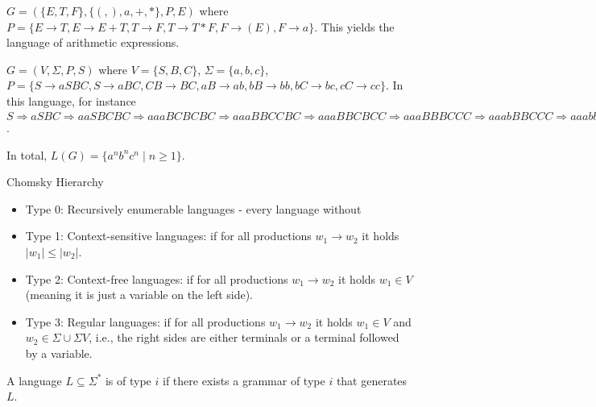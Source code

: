 \documentclass{beamer}
\begin{document}
\begin{frame}
    \begin{example}
        $G=(\{E,T,F\},\{(,),a,+,*\},P,E)$ where $P=\{E\to T, E\to E+T, T\to F, T\to T*F, F\to (E), F\to a\}$. This yields the language of arithmetic expressions.
    \end{example}
\end{frame}

\begin{frame}
    \begin{example}
        $G=(V,\Sigma,P,S)$ where $V=\{S,B,C\}$, $\Sigma=\{a,b,c\}$, $P=\{S\to aSBC, S\to aBC, CB\to BC, aB\to ab, bB\to bb, bC\to bc, cC\to cc\}$.
        In this language, for instance $S\Rightarrow aSBC\Rightarrow aaSBCBC\Rightarrow aaaBCBCBC\Rightarrow aaaBBCCBC\Rightarrow aaaBBCBCC\Rightarrow aaaBBBCCC\Rightarrow aaabBBCCC\Rightarrow aaabbBCCC\Rightarrow aaabbbCCC\Rightarrow aaaabbbcCC\Rightarrow aaabbbccC\Rightarrow aaabbbccc=a^3b^3c^3$. 

        In total, $L(G)=\{a^nb^nc^n\mid n\geq 1\}$.
    \end{example}
\end{frame}

\begin{frame}{Chomsky Hierarchy}
    \begin{itemize}
        \item Type 0: Recursively enumerable languages - every language without 
        \item Type 1: Context-sensitive languages: if for all productions $w_1\to w_2$ it holds $|w_1|\leq |w_2|$.
        \item Type 2: Context-free languages: if for all productions $w_1\to w_2$ it holds $w_1\in V$ (meaning it is just a variable on the left side).
        \item Type 3: Regular languages: if for all productions $w_1\to w_2$ it holds $w_1\in V$ and $w_2\in \Sigma\cup \Sigma V$, i.e., the right sides are either terminals or a terminal followed by a variable.
    \end{itemize}
    A language $L\subseteq \Sigma^*$ is of type $i$ if there exists a grammar of type $i$ that generates $L$.
\end{frame}
\end{document}
